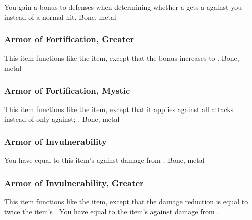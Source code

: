 You gain a  bonus to defenses when determining whether a  gets a  against you instead of a normal hit.
 
 Bone, metal
\lowercase{\hypertarget{item:Armor of Fortification, Greater}{}}\label{item:Armor of Fortification, Greater}
\hypertarget{item:Armor of Fortification, Greater}{\subsubsection{Armor of Fortification, Greater\hfill{}}}
This item functions like the  item, except that the bonus increases to .
 
 Bone, metal
\lowercase{\hypertarget{item:Armor of Fortification, Mystic}{}}\label{item:Armor of Fortification, Mystic}
\hypertarget{item:Armor of Fortification, Mystic}{\subsubsection{Armor of Fortification, Mystic\hfill{}}}
This item functions like the  item, except that it applies against all attacks instead of only against; .
 
 Bone, metal
\lowercase{\hypertarget{item:Armor of Invulnerability}{}}\label{item:Armor of Invulnerability}
\hypertarget{item:Armor of Invulnerability}{\subsubsection{Armor of Invulnerability\hfill{}}}
You have  equal to this item's  against damage from .
 
 Bone, metal
\lowercase{\hypertarget{item:Armor of Invulnerability, Greater}{}}\label{item:Armor of Invulnerability, Greater}
\hypertarget{item:Armor of Invulnerability, Greater}{\subsubsection{Armor of Invulnerability, Greater\hfill{}}}
This item functions like the  item, except that the damage reduction is equal to twice the item's .
You have  equal to the item's  against damage from .
